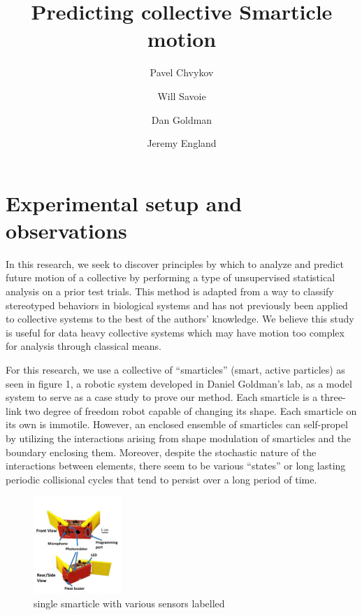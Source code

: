 \documentclass[reprint,prx]{revtex4-1}
\renewcommand{\=}[1]{\stackrel{#1}{=}} %
\renewcommand{\(}{\left (}
\renewcommand{\)}{\right  )}
\renewcommand{\[}{\left [}
\renewcommand{\]}{\right ]}
\newcommand{\<}{\left <}
\renewcommand{\>}{\right >}
\theoremstyle{definition}
\theoremstyle{remark}
\begin{document}
\title{Predicting collective Smarticle motion}

\author{Pavel Chvykov}
\author{Will Savoie}
\author{Dan Goldman}
\author{Jeremy England}


\maketitle

\tableofcontents

\section{Experimental setup and observations}
In this research, we seek to discover principles by which to analyze and predict future motion of a collective by performing a type of unsupervised statistical analysis on a prior test trials. This method is adapted from a way to classify stereotyped behaviors in biological systems and has not previously been applied to collective systems to the best of the authors’ knowledge. We believe this study is useful for data heavy collective systems which may have motion too complex for analysis through classical means. 

For this research, we use a collective of “smarticles” (smart, active particles) as seen in figure 1, a robotic system developed in Daniel Goldman’s lab, as a model system to serve as a case study to prove our method. Each smarticle is a three-link  two degree of freedom robot capable of changing its shape. Each smarticle on its own is immotile. However, an enclosed ensemble of smarticles can self-propel by utilizing the interactions arising from shape modulation of smarticles and the boundary enclosing them. Moreover, despite the stochastic nature of the interactions between elements, there seem to be various “states” or long lasting periodic collisional cycles that tend to persist over a long period of time.

\begin{figure}
\includegraphics[width=0.3\textwidth]{Smarticle.pdf}
\caption{single smarticle with various sensors labelled}
\end{figure}
\end{document}
